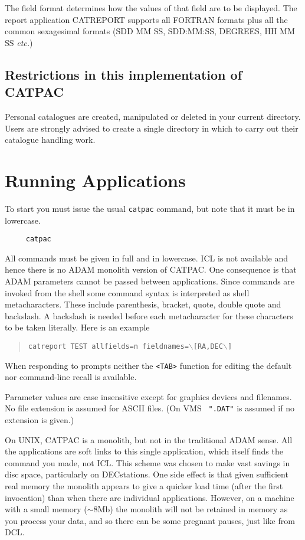 The field format determines how the values of that field are to be displayed.
The report application CATREPORT supports all FORTRAN formats plus all the
common sexagesimal formats (SDD MM SS, SDD:MM:SS, DEGREES, HH MM SS
{\em etc.})

\subsection {Restrictions in this implementation of CATPAC}

Personal catalogues are created, manipulated or deleted in your current
directory. Users are strongly advised to create a single directory in which to
carry out their catalogue handling work.


\section{Running Applications}

To start you must issue the usual {\tt catpac} command, but note that
it must be in lowercase.

\begin{verbatim}
     catpac
\end{verbatim}

All commands must be given in full and in lowercase.  {\sc ICL} is
not available and hence there is no {\sc ADAM} monolith version of
{\sc CATPAC}.  One consequence is that {\sc ADAM} parameters cannot
be passed between applications.  Since commands are invoked from the
shell some command syntax is interpreted as shell metacharacters.  These
include parenthesis, bracket, quote, double quote and backslash.  A
backslash is needed before each metacharacter for these characters to be
taken literally.  Here is an example

\begin{quote}
{\tt catreport TEST allfields=n fieldnames=$\backslash$[RA,DEC$\backslash$]}
\end{quote}

When responding to prompts neither the {\tt <TAB>} function for editing
the default nor command-line recall is available.

Parameter values are case insensitive except for graphics devices and
filenames.  No file extension is assumed for ASCII files. (On VMS {\tt
".DAT"} is assumed if no extension is given.)

On UNIX, {\sc CATPAC} is a monolith, but not in the traditional
{\sc ADAM} sense. All the applications are soft links to this single
application, which itself finds the command you made, not {\sc ICL}.  This
scheme was chosen to make vast savings in disc space, particularly on
DECstations. One side effect is that given sufficient real memory the
monolith appears to give a quicker load time (after the first
invocation) than when there are individual applications. However, on a
machine with a small memory ($\sim$8Mb) the monolith will not be
retained in memory as you process your data, and so there can be some
pregnant pauses, just like from {\sc DCL}.

